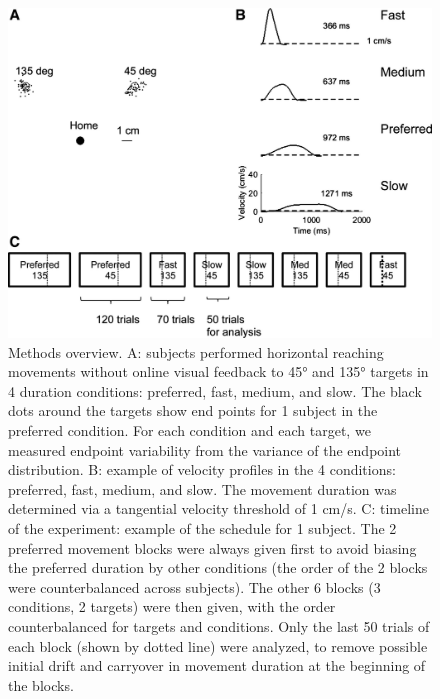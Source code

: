\begin{figure}
	\centering
	\includegraphics[width=0.8\linewidth]{figures/MT-experiment}
	\caption[Methods overview]{Methods overview. A: subjects performed horizontal reaching movements without online visual feedback to \ang{45} and \ang{135} targets in 4 duration conditions: preferred, fast, medium, and slow. The black dots around the targets show end points for 1 subject in the preferred condition. For each condition and each target, we measured endpoint variability from the variance of the endpoint distribution. B: example of velocity profiles in the 4 conditions: preferred, fast, medium, and slow. The movement duration was determined via a tangential velocity threshold of 1 cm/s. C: timeline of the experiment: example of the schedule for 1 subject. The 2 preferred movement blocks were always given first to avoid biasing the preferred duration by other conditions (the order of the 2 blocks were counterbalanced across subjects). The other 6 blocks (3 conditions, 2 targets) were then given, with the order counterbalanced for targets and conditions. Only the last 50 trials of each block (shown by dotted line) were analyzed, to remove possible initial drift and carryover in movement duration at the beginning of the blocks.}
	\label{fig:mt-experiment}
\end{figure}

